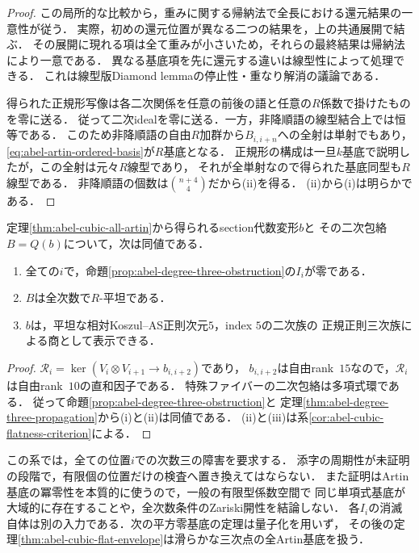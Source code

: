 \begin{proof}
この局所的な比較から，重みに関する帰納法で全長における還元結果の一意性が従う．
実際，初めの還元位置が異なる二つの結果を，上の共通展開で結ぶ．
その展開に現れる項は全て重みが小さいため，それらの最終結果は帰納法により一意である．
異なる基底項を先に還元する違いは線型性によって処理できる．
これは線型版Diamond lemmaの停止性・重なり解消の議論である．

得られた正規形写像は各二次関係を任意の前後の語と任意の$R$係数で掛けたものを零に送る．
従って二次idealを零に送る．一方，非降順語の線型結合上では恒等である．
このため非降順語の自由$R$加群から$B_{i,i+n}$への全射は単射でもあり，
\eqref{eq:abel-artin-ordered-basis}が$R$基底となる．
正規形の構成は一旦$k$基底で説明したが，この全射は元々$R$線型であり，
それが全単射なので得られた基底同型も$R$線型である．
非降順語の個数は$\binom{n+4}{4}$だから\textup{(ii)}を得る．
\textup{(ii)}から\textup{(i)}は明らかである．
\end{proof}

\begin{corollary}[全次数平坦性障害の次数三への集約]
\label{cor:abel-all-flatness-from-cubic-obstruction}
定理\ref{thm:abel-cubic-all-artin}から得られるsection代数変形$b$と
その二次包絡$B=Q(b)$について，次は同値である．
\begin{enumerate}[label=\textup{(\roman*)}]
\item 全ての$i$で，命題\ref{prop:abel-degree-three-obstruction}の$I_i$が零である．
\item $B$は全次数で$R$-平坦である．
\item $b$は，平坦な相対Koszul--AS正則次元$5$，index $5$の二次族の
  正規正則三次族による商として表示できる．
\end{enumerate}
\end{corollary}
\begin{proof}
$\mathcal R_i=\ker(V_i\otimes V_{i+1}\to b_{i,i+2})$であり，
$b_{i,i+2}$は自由rank~$15$なので，$\mathcal R_i$は自由rank~$10$の直和因子である．
特殊ファイバーの二次包絡は多項式環である．
従って命題\ref{prop:abel-degree-three-obstruction}と
定理\ref{thm:abel-degree-three-propagation}から\textup{(i)}と\textup{(ii)}は同値である．
\textup{(ii)}と\textup{(iii)}は系\ref{cor:abel-cubic-flatness-criterion}による．
\end{proof}

この系では，全ての位置$i$での次数三の障害を要求する．
添字の周期性が未証明の段階で，有限個の位置だけの検査へ置き換えてはならない．
また証明はArtin基底の冪零性を本質的に使うので，一般の有限型係数空間で
同じ単項式基底が大域的に存在することや，全次数条件のZariski開性を結論しない．
各$I_i$の消滅自体は別の入力である．次の平方零基底の定理は量子化を用いず，
その後の定理\ref{thm:abel-cubic-flat-envelope}は滑らかな三次点の全Artin基底を扱う．


